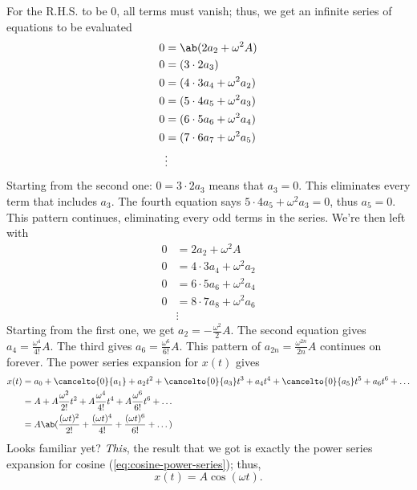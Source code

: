 For the R.H.S. to be $0$, all terms must vanish; thus, we get an infinite series of equations to be evaluated
\begin{equation}
	\begin{aligned}
		0 & = \ab(2a_2 + \omega^2A)       \\
		0 & = (3 \cdot 2a_3)              \\
		0 & = (4\cdot 3a_4 + \omega^2a_2) \\
		0 & = (5\cdot 4a_5 + \omega^2a_3) \\
		0 & = (6\cdot 5a_6 + \omega^2a_4) \\
		0 & = (7\cdot 6a_7 + \omega^2a_5) \\
		  & \vdots
	\end{aligned}
\end{equation}
Starting from the second one: $0 = 3 \cdot 2a_3$ means that $a_3 = 0$. This eliminates every term that includes $a_3$. The fourth equation says $5\cdot 4a_5 + \omega^2a_3 = 0$, thus $a_5 = 0$. This pattern continues, eliminating every odd terms in the series. We're then left with
\begin{equation}
	\begin{aligned}
		0 & = 2a_2 + \omega^2A          \\
		0 & = 4\cdot 3a_4 + \omega^2a_2 \\
		0 & = 6\cdot 5a_6 + \omega^2a_4 \\
		0 & = 8\cdot 7a_8 + \omega^2a_6 \\
		  & \vdots
	\end{aligned}
\end{equation}
Starting from the first one, we get $a_2 = -\frac{\omega^2}{2}A$. The second equation gives $a_4 = \frac{\omega^4}{4!}A$. The third gives $a_6 = \frac{\omega^6}{6!}A$. This pattern of $a_{2n} = \frac{\omega^{2n}}{2n}A$ continues on forever. The power series expansion for $x(t)$ gives
\begin{align}
	x(t) & = a_0 + \cancelto{0}{a_1} + a_2t^2 + \cancelto{0}{a_3}t^3 + a_4t^4 + \cancelto{0}{a_5}t^5 + a_6t^6 + \dots \\
	     & = A + A\frac{\omega^{2}}{2!}t^2 + A\frac{\omega^{4}}{4!}t^4 + A\frac{\omega^{6}}{6!}t^6 + \dots            \\
	     & = A\ab(\frac{(\omega t)^2}{2!} + \frac{(\omega t)^4}{4!} + \frac{(\omega t)^6}{6!} + \dots)
\end{align}
Looks familiar yet? \emph{This}, the result that we got is exactly the power series expansion for cosine (\cref{eq:cosine-power-series}); thus,
\begin{equation}
	x(t) = A\cos(\omega t).
\end{equation}


